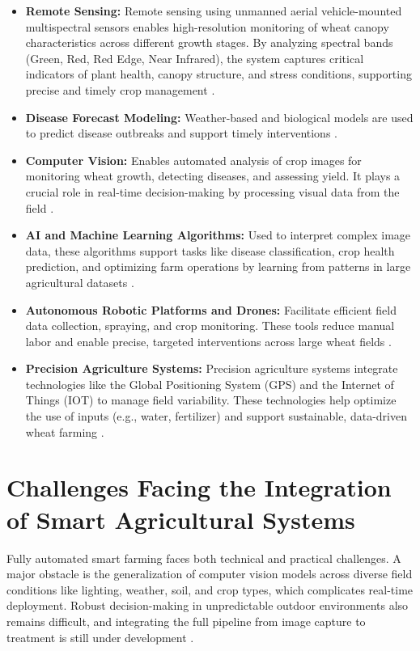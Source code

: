 \begin{itemize}
    \item \textbf{Remote Sensing:} Remote sensing using unmanned aerial vehicle-mounted multispectral sensors enables high-resolution monitoring of wheat canopy characteristics across different growth stages. By analyzing spectral bands (Green, Red, Red Edge, Near Infrared), the system captures critical indicators of plant health, canopy structure, and stress conditions, supporting precise and timely crop management \parencite{zhang2025precision}.
    \item \textbf{Disease Forecast Modeling:} Weather-based and biological models are used to predict disease outbreaks and support timely interventions \parencite{mehta2014wheat}.
    \item \textbf{Computer Vision:} Enables automated analysis of crop images for monitoring wheat growth, detecting diseases, and assessing yield. It plays a crucial role in real-time decision-making by processing visual data from the field \parencite{ghazal2024computer}.
    \item \textbf{AI and Machine Learning Algorithms:} Used to interpret complex image data, these algorithms support tasks like disease classification, crop health prediction, and optimizing farm operations by learning from patterns in large agricultural datasets \parencite{ghazal2024computer}.
    \item \textbf{Autonomous Robotic Platforms and Drones:} Facilitate efficient field data collection, spraying, and crop monitoring. These tools reduce manual labor and enable precise, targeted interventions across large wheat fields \parencite{ghazal2024computer}.
    \item \textbf{Precision Agriculture Systems:} Precision agriculture systems integrate technologies like the Global Positioning System (GPS) and the Internet of Things  (IOT) to manage field variability. These technologies help optimize the use of inputs (e.g., water, fertilizer) and support sustainable, data-driven wheat farming \parencite{ghazal2024computer}.
\end{itemize}

\section{Challenges Facing the Integration of Smart Agricultural Systems}
Fully automated smart farming faces both technical and practical challenges. A major obstacle is the generalization of computer vision models across diverse field conditions like lighting, weather, soil, and crop types, which complicates real-time deployment. Robust decision-making in unpredictable outdoor environments also remains difficult, and integrating the full pipeline from image capture to treatment is still under development \parencite{ghazal2024computer}.

